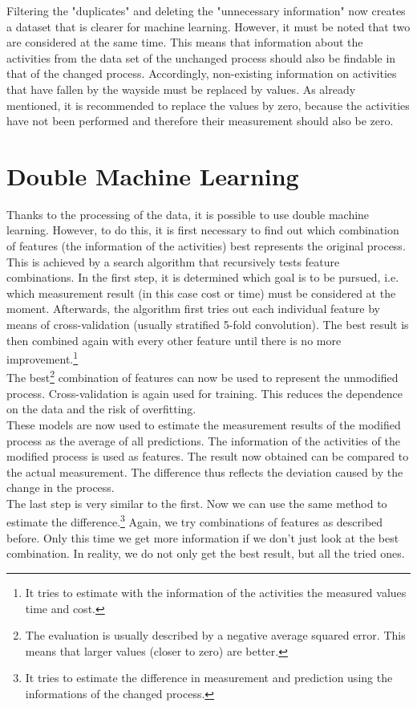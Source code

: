     Filtering the "duplicates" and deleting the "unnecessary information" now creates a dataset that is clearer for machine learning. However, it must be noted that two are considered at the same time. This means that information about the activities from the data set of the unchanged process should also be findable in that of the changed process. Accordingly, non-existing information on activities that have fallen by the wayside must be replaced by values. As already mentioned, it is recommended to replace the values by zero, because the activities have not been performed and therefore their measurement should also be zero.

    \section{Double Machine Learning}
    Thanks to the processing of the data, it is possible to use double machine learning. However, to do this, it is first necessary to find out which combination of features (the information of the activities) best represents the original process. This is achieved by a search algorithm that recursively tests feature combinations. In the first step, it is determined which goal is to be pursued, i.e. which measurement result (in this case cost or time) must be considered at the moment. Afterwards, the algorithm first tries out each individual feature by means of cross-validation (usually stratified 5-fold convolution). The best result is then combined again with every other feature until there is no more improvement.\footnote{It tries to estimate with the information of the activities the measured values time and cost.}\\
    The best\footnote{The evaluation is usually described by a negative average squared error. This means that larger values (closer to zero) are better.} combination of features can now be used to represent the unmodified process. Cross-validation is again used for training. This reduces the dependence on the data and the risk of overfitting.\\
    These models are now used to estimate the measurement results of the modified process as the average of all predictions. The information of the activities of the modified process is used as features. The result now obtained can be compared to the actual measurement. The difference thus reflects the deviation caused by the change in the process.\\
    The last step is very similar to the first. Now we can use the same method to estimate the difference.\footnote{It tries to estimate the difference in measurement and prediction using the informations of the changed process.} Again, we try combinations of features as described before. Only this time we get more information if we don't just look at the best combination. In reality, we do not only get the best result, but all the tried ones.\\
